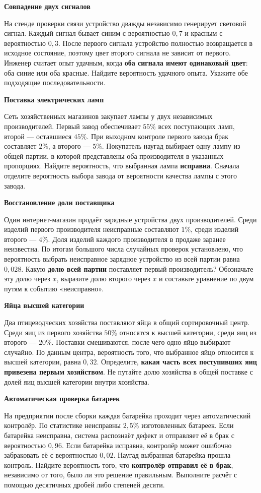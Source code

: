 \documentclass[a4paper,12pt]{article}
\newcommand{\exercise}[2]{\needspace{7\baselineskip}\vspace{7pt}\noindent{\large\color{darkaccent}\bfseries #1.}\hspace{6pt}\textbf{#2}\par\vspace{1pt}}
\begin{document}
\exercise{6}{Совпадение двух сигналов}
На стенде проверки связи устройство дважды независимо генерирует световой сигнал. Каждый сигнал бывает синим с вероятностью \(0{,}7\) и красным с вероятностью \(0{,}3\). После первого сигнала устройство полностью возвращается в исходное состояние, поэтому цвет второго сигнала не зависит от первого. Инженер считает опыт удачным, когда \textbf{оба сигнала имеют одинаковый цвет}: оба синие или оба красные. Найдите вероятность удачного опыта. Укажите обе подходящие последовательности.

\exercise{7}{Поставка электрических ламп}
Сеть хозяйственных магазинов закупает лампы у двух независимых производителей. Первый завод обеспечивает \(55\%\) всех поступающих ламп, второй — оставшиеся \(45\%\). При выходном контроле первого завода брак составляет \(2\%\), а второго — \(5\%\). Покупатель наугад выбирает одну лампу из общей партии, в которой представлены оба производителя в указанных пропорциях. Найдите вероятность, что выбранная лампа \textbf{исправна}. Сначала отделите вероятность выбора завода от вероятности качества лампы с этого завода.

\exercise{8}{Восстановление доли поставщика}
Один интернет-магазин продаёт зарядные устройства двух производителей. Среди изделий первого производителя неисправные составляют \(1\%\), среди изделий второго — \(4\%\). Доля изделий каждого производителя в продаже заранее неизвестна. По итогам большого числа случайных проверок установлено, что вероятность выбрать неисправное зарядное устройство из всей партии равна \(0{,}028\). Какую \textbf{долю всей партии} поставляет первый производитель? Обозначьте эту долю через \(x\), выразите долю второго через \(x\) и составьте уравнение по двум путям к событию «неисправно».

\exercise{9}{Яйца высшей категории}
Два птицеводческих хозяйства поставляют яйца в общий сортировочный центр. Среди яиц из первого хозяйства \(50\%\) относятся к высшей категории, среди яиц из второго — \(20\%\). Поставки смешиваются, после чего одно яйцо выбирают случайно. По данным центра, вероятность того, что выбранное яйцо относится к высшей категории, равна \(0{,}32\). Определите, \textbf{какая часть всех поступивших яиц привезена первым хозяйством}. Не путайте долю хозяйства в общей поставке с долей яиц высшей категории внутри хозяйства.

\exercise{10}{Автоматическая проверка батареек}
На предприятии после сборки каждая батарейка проходит через автоматический контролёр. По статистике неисправны \(2{,}5\%\) изготовленных батареек. Если батарейка неисправна, система распознаёт дефект и отправляет её в брак с вероятностью \(0{,}96\). Если батарейка исправна, контролёр может ошибочно забраковать её с вероятностью \(0{,}02\). Наугад выбранная батарейка прошла контроль. Найдите вероятность того, что \textbf{контролёр отправил её в брак}, независимо от того, было ли это решение правильным. Выполните расчёт с помощью десятичных дробей либо степеней десяти.
\end{document}
